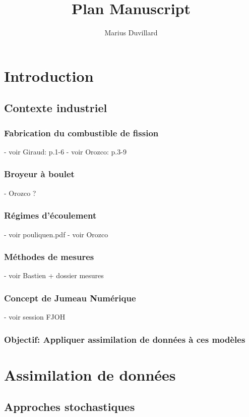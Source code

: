 \documentclass{article}
\title{Plan Manuscript}
\author{Marius Duvillard}
\begin{document}
\maketitle
\tableofcontents
\newpage

\section{Introduction}

\subsection{Contexte industriel}

\subsubsection{Fabrication du combustible de fission}
- voir Giraud: p.1-6
- voir Orozco: p.3-9

\subsubsection{Broyeur à boulet}
- Orozco ?

\subsubsection{Régimes d'écoulement}
- voir pouliquen.pdf
- voir Orozco

\subsubsection{Méthodes de mesures}
- voir Bastien + dossier mesures
\subsubsection{Concept de Jumeau Numérique}
- voir session FJOH

\subsubsection{Objectif: Appliquer assimilation de données à ces modèles}
\section{Assimilation de données}

\subsection{Approches stochastiques}
\end{document}
